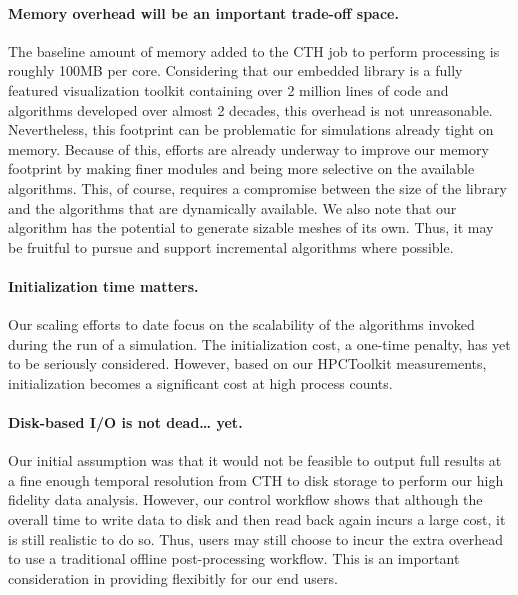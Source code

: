 \paragraph{Memory overhead will be an important trade-off space.}
The baseline amount of memory added to the CTH job to perform \insitu
processing is roughly 100MB per core.  Considering that our embedded
\insitu library is a fully featured visualization toolkit containing over 2
million lines of code and algorithms developed over almost 2 decades, this
overhead is not unreasonable.  Nevertheless, this footprint can be
problematic for simulations already tight on memory.  Because of this,
efforts are already underway to improve our memory footprint by making
finer modules and being more selective on the available algorithms.  This,
of course, requires a compromise between the size of the library and the
algorithms that are dynamically available.  We also note that our algorithm
has the potential to generate sizable meshes of its own.  Thus, it may be
fruitful to pursue and support incremental algorithms where possible.

\paragraph{Initialization time matters.}  Our scaling efforts to date
focus on the scalability of the algorithms invoked during the run of a
simulation.  The initialization cost, a one-time penalty, has yet to be
seriously considered.  However, based on our HPCToolkit measurements,
initialization becomes a significant cost at high process counts.

\paragraph{Disk-based I/O is not dead\ldots{} yet.} Our initial assumption
was that it would not be feasible to output full results at a fine enough
temporal resolution from CTH to disk storage to perform our high fidelity
data analysis.  However, our control workflow shows that although the overall
time to write data to disk and then read back again incurs a large cost, it
is still realistic to do so.  Thus, users may still choose to incur the
extra overhead to use a traditional offline post-processing \vda workflow.
This is an important consideration in providing flexibitly for our end users.

